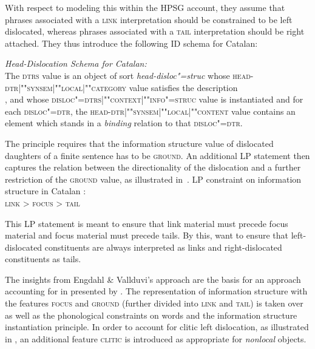 \documentclass[output=paper
	        ,collection
	        ,collectionchapter
 	        ,biblatex
                ,babelshorthands
                ,newtxmath
                ,draftmode
                ,colorlinks, citecolor=brown
]{langscibook}
\begin{document}
With respect to modeling this within the HPSG account, they assume
that phrases associated with a \textsc{link} interpretation should be
constrained to be left dislocated, whereas phrases associated with a
\textsc{tail} interpretation should be right attached.
They thus introduce the following ID schema for Catalan:
\begin{sloppy}
\begin{exe}
\ex  \textit{Head-Dislocation Schema for Catalan:}\\
  The \textsc{dtrs} value is an object of sort
  \textit{head-disloc"=struc} whose
  \textsc{head-dtr|""syn\-sem|""local|""category} value satisfies the
  description\\
  , and whose
  \textsc{disloc"=dtrs|""context|""info"=struc} value is instantiated and
  for each \textsc{disloc"=dtr}, the
  \textsc{head-dtr|""synsem|""local|""content} value contains an element
  which stands in a \textit{binding} relation to that
  \textsc{disloc"=dtr}.
\end{exe}
\end{sloppy}

The principle requires that the information structure value of
dislocated daughters of a finite sentence has to be
\textsc{ground}. An additional LP statement then captures the relation
between the directionality of the dislocation and a further
restriction of the \textsc{ground} value, as illustrated in~.
\ea
LP constraint on information structure in Catalan  \citep{EV96a}:\\
  \centering
  \textsc{link} > \textsc{focus} > \textsc{tail}

  \label{fig:lp-catalan}
\z
This LP statement is meant to ensure that link material must precede
focus material and focus material must precede tails. By this,
\cite{EV96a} want to ensure that left-dislocated constituents are always
interpreted as links and right-dislocated constituents as tails.

The insights from Engdahl \& Vallduvi's approach are the basis for an
approach accounting for  in  presented by
\cite{AK2002a}. The representation of information structure with the
features \textsc{focus} and \textsc{ground} (further divided into
\textsc{link} and \textsc{tail}) is taken over as well as the
phonological constraints on words and the information structure
instantiation principle. In order to account for clitic left
dislocation, as illustrated in , an
additional feature \textsc{clitic} is introduced as appropriate for
\textit{nonlocal} objects.
\end{document}
